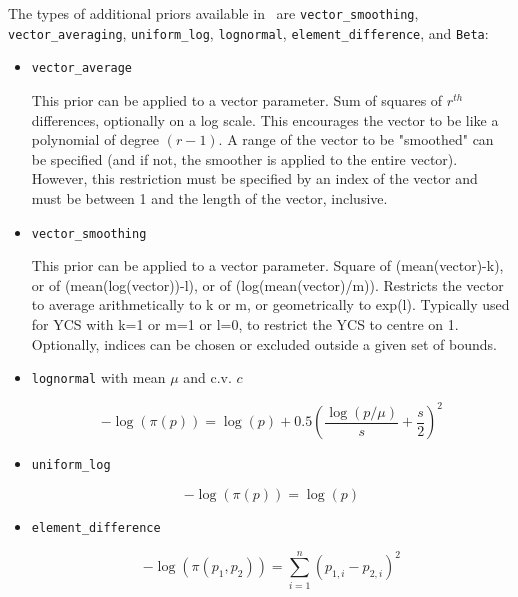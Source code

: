 The types of additional priors available in \CNAME\ are \texttt{vector\_smoothing}, \texttt{vector\_averaging}, \texttt{uniform\_log}, \texttt{lognormal}, \texttt{element\_difference}, and \texttt{Beta}:

\begin{itemize}
	\item \texttt{vector\_average}\label{sec:AdditionalPrior-VectorAverage}

	This prior can be applied to a vector parameter. Sum of squares of $r^{th}$ differences, optionally on a log scale. This encourages the vector to be like a polynomial of degree $(r-1)$. A range of the vector to be "smoothed" can be specified (and if not, the smoother is applied to the entire vector). However, this restriction must be specified by an index of the vector and must be between 1 and the length of the vector, inclusive.

	\item \texttt{vector\_smoothing}\label{sec:AdditionalPrior-VectorSmoothing}

	This prior can be applied to a vector parameter. Square of (mean(vector)-k), or of (mean(log(vector))-l), or of (log(mean(vector)/m)). Restricts the vector to average arithmetically to k or m, or geometrically to exp(l). Typically used for YCS with k=1 or m=1 or l=0, to restrict the YCS to centre on 1. Optionally, indices can be chosen or excluded outside a given set of bounds.

	\item\texttt{lognormal} with mean $\mu$ and c.v. $c$\label{sec:AdditionalPrior-LogNormal}

	\begin{equation}
	- \log \left(\pi \left(p \right) \right) = \log \left( p \right) + 0.5 \left( \frac{\log \left( p / \mu \right)}{s} + \frac{s}{2} \right)^2
	\end{equation}

	\item\texttt{uniform\_log}\label{sec:AdditionalPrior-UniformLog}

	\begin{equation}
	- \log \left(\pi \left(p \right) \right) = \log \left( p \right)
	\end{equation}

	\item\texttt{element\_difference}\label{sec:AdditionalPrior-ElementDifference}

	\begin{equation}
	- \log \left(\pi \left(p_1,p_2 \right) \right) = \sum_{i = 1}^n \left( p_{1,i} - p_{2,i} \right)^2
	\end{equation}


\end{itemize}

